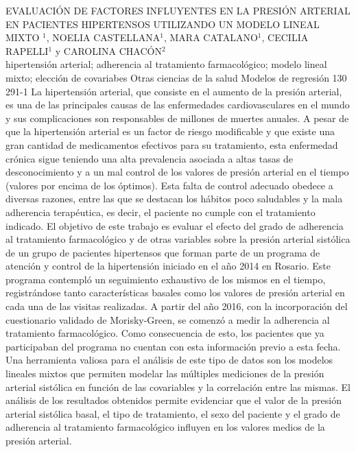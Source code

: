 \A
{EVALUACIÓN DE FACTORES INFLUYENTES EN LA PRESIÓN ARTERIAL EN PACIENTES HIPERTENSOS UTILIZANDO UN MODELO LINEAL MIXTO}
{$^1$, NOELIA CASTELLANA$^1$, MARA CATALANO$^1$, CECILIA RAPELLI$^1$ y CAROLINA CHACÓN$^2$}
{
\\}
{hipertensión arterial; adherencia al tratamiento farmacológico; modelo lineal mixto; elección de covariabes} 
 {Otras ciencias de la salud} 
 {Modelos de regresión} 
 {130} 
 {291-1}
{La hipertensión arterial, que consiste en el aumento de la presión arterial, es una de las principales causas de las enfermedades cardiovasculares en el mundo y sus complicaciones son responsables de millones de muertes anuales. A pesar de que la hipertensión arterial es un factor de riesgo modificable y que existe una gran cantidad de medicamentos efectivos para su tratamiento, esta enfermedad crónica sigue teniendo una alta prevalencia asociada a altas tasas de desconocimiento y a un mal control de los valores de presión arterial en el tiempo (valores por encima de los óptimos). Esta falta de control adecuado obedece a diversas razones, entre las que se destacan los hábitos poco saludables y la mala adherencia terapéutica, es decir, el paciente no cumple con el tratamiento indicado. El objetivo de este trabajo es evaluar el efecto del grado de adherencia al tratamiento farmacológico y de otras variables sobre la presión arterial sistólica de un grupo de pacientes hipertensos que forman parte de un programa de atención y control de la hipertensión iniciado en el año 2014 en Rosario. Este programa contempló un seguimiento exhaustivo de los mismos en el tiempo, registrándose tanto características basales como los valores de presión arterial en cada una de las visitas realizadas. A partir del año 2016, con la incorporación del cuestionario validado de Morisky-Green, se comenzó a medir la adherencia al tratamiento farmacológico. Como consecuencia de esto, los pacientes que ya participaban del programa no cuentan con esta información previo a esta fecha. Una herramienta valiosa para el análisis de este tipo de datos son los modelos lineales mixtos que permiten modelar las múltiples mediciones de la presión arterial sistólica en función de las covariables y la correlación entre las mismas. El análisis de los resultados obtenidos permite evidenciar que el valor de la presión arterial sistólica basal, el tipo de tratamiento, el sexo del paciente y el grado de adherencia al tratamiento farmacológico influyen en los valores medios de la presión arterial.}
